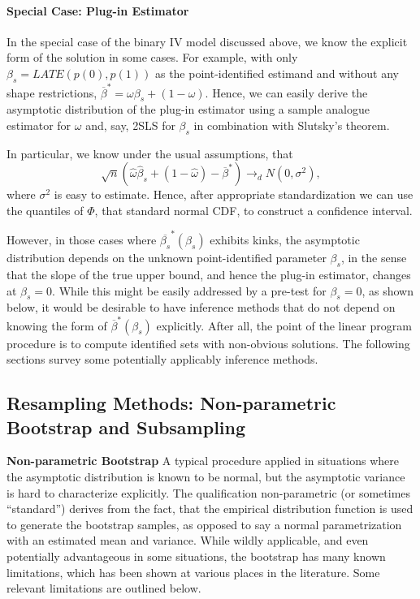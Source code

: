 \documentclass[12pt,a4paper,english]{article} %
\numberwithin{equation}{section}
\theoremstyle{definition}
\theoremstyle{remark}
\theoremstyle{plain}
\begin{document}
\paragraph{Special Case: Plug-in Estimator}
In the special case of the binary IV model discussed above, we know the explicit form of the solution in some cases.
For example, with only $\beta_s = LATE(p(0), p(1))$ as the point-identified estimand and without any shape restrictions, $\overline{\beta}^* = \omega \beta_s + (1-\omega)$.
Hence, we can easily derive the asymptotic distribution of the plug-in estimator using a sample analogue estimator for $\omega$ and, say, 2SLS for $\beta_s$ in combination with Slutsky's theorem.

In particular, we know under the usual assumptions, that
\begin{equation*}
  \sqrt{n} \left(\hat{\omega}\hat{\beta}_s + (1-\hat{\omega}) - \overline{\beta}^*\right) \to_d N(0, \sigma^2),
\end{equation*}
where $\sigma^2$ is easy to estimate.
Hence, after appropriate standardization we can use the quantiles of $\Phi$, that standard normal CDF, to construct a confidence interval.

However, in those cases where $\overline{\beta_s}^*(\beta_s)$ exhibits kinks, the asymptotic distribution depends on the unknown point-identified parameter $\beta_s$, in the sense that the slope of the true upper bound, and hence the plug-in estimator, changes at $\beta_s=0$.
While this might be easily addressed by a pre-test for $\beta_s=0$, as shown below, it would be desirable to have inference methods that do not depend on knowing the form of $\overline{\beta}^*(\beta_s)$ explicitly.
After all, the point of the linear program procedure is to compute identified sets with non-obvious solutions.
The following sections survey some potentially applicably inference methods.

\subsection{Resampling Methods: Non-parametric Bootstrap and Subsampling}

\textbf{Non-parametric Bootstrap}
A typical procedure applied in situations where the asymptotic distribution is known to be normal, but the asymptotic variance is hard to characterize explicitly.
The qualification non-parametric (or sometimes ``standard'') derives from the fact, that the empirical distribution function is used to generate the bootstrap samples, as opposed to say a normal parametrization with an estimated mean and variance.
While wildly applicable, and even potentially advantageous in some situations, the bootstrap has many known limitations, which has been shown at various places in the literature.
Some relevant limitations are outlined below.
\end{document}
